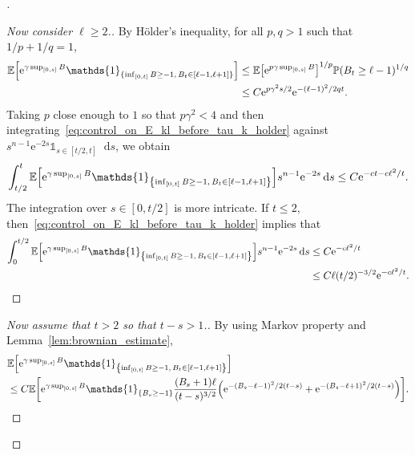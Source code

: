 \documentclass[10pt]{amsart}
\theoremstyle{definition}\newtheorem{defi}[theo]{Definition}\newtheorem{rema}[theo]{Remark}\newtheorem{exam}[theo]{Example}\newtheorem{exem}[theo]{Example}\newtheorem{nota}[theo]{Notation}
\newcommand{\e}{\mathrm{e}}
\renewcommand{\d}[1]{\mathop{}\!\mathrm{d}#1}
\newcommand{\E}{\mathbb{E}}
\renewcommand{\P}{\mathbb{P}}
\newcommand\1{\mathds{1}}
\let\originalleft\left
\let\originalright\right
\renewcommand{\left}{\mathopen{}\mathclose\bgroup\originalleft}
\renewcommand{\right}{\aftergroup\egroup\originalright}
\newenvironment{proofc}[1][\proofname]{\begin{proof}[#1]}{\end{proof}}
\begin{document}
\begin{proofc}
\begin{proof}[{Now consider $\ell \geq 2$.}]
By H\"older's inequality, for all $p, q > 1$ such that $1/p + 1/q = 1$,
\begin{equation}\label{eq:control_on_E_kl_before_tau_k_holder}
\begin{aligned}[t]
\E \left[\e^{\gamma \sup_{[0, s]} B} \1_{\{\inf_{[0, t]} B \geq -1,\, B_t \in [\ell-1, \ell+1]\}} \right] &\leq \E \left[\e^{p \gamma \sup_{[0, s]} B} \right]^{1/p} \P(B_t \geq \ell - 1)^{1/q} \\
& \leq C \e^{p \gamma^2 s/2} \e^{-(\ell - 1)^2/2qt}.
\end{aligned}
\end{equation}
Taking $p$ close enough to $1$ so that $p\gamma^2 < 4$ and then integrating~\eqref{eq:control_on_E_kl_before_tau_k_holder} against $s^{n-1} \e^{-2s} \1_{s \in [t/2, t]} \d{s}$, we obtain
\begin{equation}
\label{eq:control_on_E_kl_before_tau_k_large_s_2}
\int_{t/2}^t \E \left[\e^{\gamma \sup_{[0, s]} B} \1_{\left\{\inf_{[0, t]} B \geq -1,\, B_t \in [\ell-1, \ell+1]\right\}} \right] s^{n-1} \e^{-2s} \d{s} \leq C \e^{-c t - c \ell^2/t}.
\end{equation}
The integration over $s \in [0, t/2]$ is more intricate. If $t \leq 2$, then~\eqref{eq:control_on_E_kl_before_tau_k_holder} implies that
\begin{equation}\label{eq:control_on_E_kl_before_tau_k_small_s_small_t}
\begin{aligned}[t]
\int_0^{t/2} \E \left[\e^{\gamma \sup_{[0, s]} B} \1_{\left\{\inf_{[0, t]} B \geq -1,\, B_t \in [\ell-1, \ell+1]\right\}} \right] s^{n-1} \e^{-2s} \d{s} & \leq C \e^{-c\ell^2/t} \\
& \leq C \ell (t/2)^{-3/2} \e^{-c\ell^2/t}.
\end{aligned}
\end{equation}
\let\qed\relax
\end{proof}
\begin{proof}[{Now assume that $t > 2$ so that $t - s > 1$.}]
By using Markov property and Lemma~\ref{lem:brownian_estimate},
\begin{equation}
\begin{aligned}[t]
&\E \left[\e^{\gamma \sup_{[0, s]} B} \1_{\left\{\inf_{[0, t]} B \geq -1,\, B_t \in [\ell-1, \ell+1]\right\}} \right]\\
&\leq C \E \left[\e^{\gamma \sup_{[0, s]} B} \1_{\left\{B_s \geq -1\right\}} \frac{(B_s + 1) \ell}{(t - s)^{3/2}} \left(\e^{-(B_s - \ell - 1)^2/2(t-s)} + \e^{-(B_s - \ell + 1)^2/2(t-s)}\right) \right].

\end{aligned}
\end{equation}
\end{proof}
\end{proofc}
\end{document}
